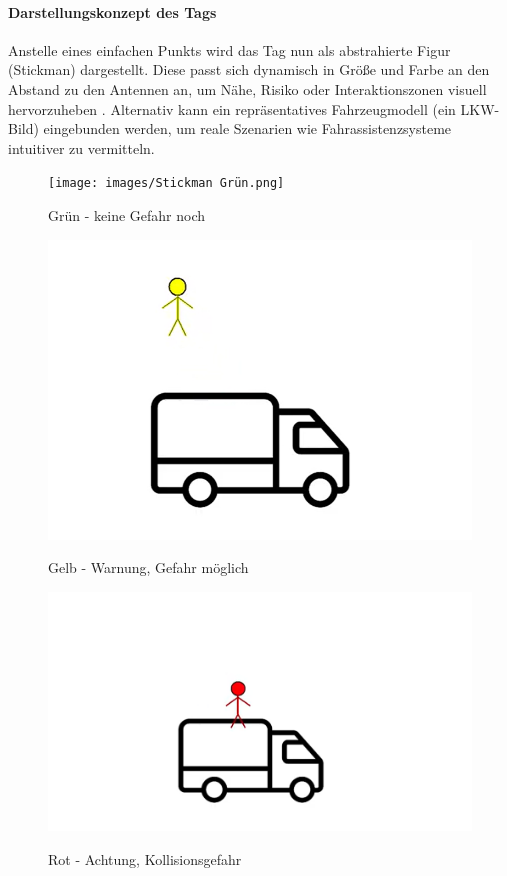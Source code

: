 \documentclass[a4paper, 12pt]{article} %
\begin{document}
\paragraph{Darstellungskonzept des Tags}

Anstelle eines einfachen Punkts wird das Tag nun als abstrahierte Figur (Stickman) dargestellt. Diese passt sich dynamisch in Größe und Farbe an
den Abstand zu den Antennen an, um Nähe, Risiko oder Interaktionszonen visuell hervorzuheben \cite{visual_risk_encoding}. Alternativ kann ein repräsentatives Fahrzeugmodell 
(ein \ac{LKW}-Bild) eingebunden werden, um reale Szenarien wie Fahrassistenzsysteme intuitiver zu vermitteln.

\begin{figure}[H]
    \texttt{[image: images/Stickman Grün.png]}\\[1ex]
    \centering
    \caption{Grün - keine Gefahr noch}
    \label{ABBILDUNG}
\end{figure}
\begin{figure}[H]
    \includegraphics[width=0.8\linewidth]{images/Stickman Gelb.png}\\[1ex]
    \centering
    \caption{Gelb - Warnung, Gefahr möglich}
    \label{ABBILDUNG}
\end{figure}
\begin{figure}[H]
    \includegraphics[width=1\linewidth]{images/Stickman Rot.png}\\[1ex]
    \centering
    \caption{Rot - Achtung, Kollisionsgefahr}
    \label{ABBILDUNG}
\end{figure}
\end{document}

